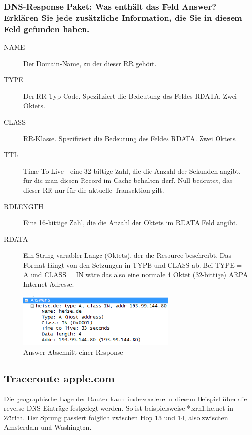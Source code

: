 \documentclass[a4paper,11pt]{scrartcl}
\begin{document}
\subsubsection{DNS-Response Paket: Was enthält das Feld Answer? Erklären Sie jede zusätzliche
Information, die Sie in diesem Feld gefunden haben.}
\begin{description}
	\item[NAME] Der Domain-Name, zu der dieser RR gehört. 
	\item[TYPE] Der RR-Typ Code. Spezifiziert die Bedeutung des Feldes RDATA. Zwei Oktets. 
	\item[CLASS] RR-Klasse. Spezifiziert die Bedeutung des Feldes RDATA. Zwei Oktets. 
	\item[TTL] Time To Live - eine 32-bittige Zahl, die die Anzahl der Sekunden angibt, für die man diesen Record im Cache behalten darf. Null bedeutet, das dieser RR nur für die aktuelle Transaktion gilt. 
	\item[RDLENGTH] Eine 16-bittige Zahl, die die Anzahl der Oktets im RDATA Feld angibt. 
	\item[RDATA] Ein String variabler Länge (Oktets), der die Resource beschreibt. Das Format hängt von den Setzungen in TYPE und CLASS ab. Bei TYPE = A und CLASS = IN wäre das also eine normale 4 Oktet (32-bittige) ARPA Internet Adresse.
\end{description}
\begin{figure}[h]
	\centering
	\includegraphics[width=0.7\textwidth]{../aufg2/dns_2_2_4.png}
	\caption{Answer-Abschnitt einer Response}
	\label{fig:dns_2_2_4}
\end{figure}

\FloatBarrier
\subsection{Traceroute apple.com}
Die geographische Lage der Router kann insbesondere in diesem Beispiel über die reverse DNS Einträge festgelegt werden. So ist beispielsweise *.zrh1.he.net in Zürich. Der Sprung passiert folglich zwischen Hop 13 und 14, also zwischen Amsterdam und Washington.
\end{document}
